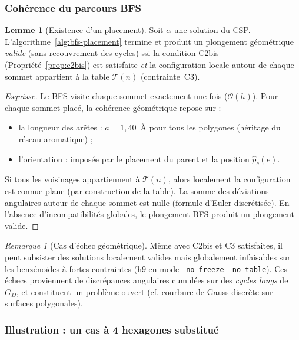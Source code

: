 \documentclass[12pt,a4paper]{article}
\theoremstyle{definition}
\newtheorem{lemme}[definition]{Lemme}
\theoremstyle{remark}
\newtheorem{remarque}[definition]{Remarque}
\newcommand{\GD}{G_{\!D}}
\newcommand{\Tn}{\mathcal{T}(n)}
\newcommand{\posIn}[2]{\hat{p}_{#1}(#2)}
\newcommand{\bigO}{\mathcal{O}}
\begin{document}
\subsubsection{Coh\'erence du parcours BFS}

\begin{lemme}[Existence d'un placement]
\label{lem:bfs-existence}
Soit $\alpha$ une solution du CSP. L'algorithme~\ref{alg:bfs-placement}
termine et produit un plongement g\'eom\'etrique \emph{valide} (sans
recouvrement des cycles) ssi la condition C2bis
(Propri\'et\'e~\ref{prop:c2bis}) est satisfaite \emph{et} la configuration
locale autour de chaque sommet appartient \`a la table $\Tn$
(contrainte~C3).
\end{lemme}

\begin{proof}[Esquisse]
Le BFS visite chaque sommet exactement une fois ($\bigO(h)$). Pour chaque
sommet plac\'e, la coh\'erence g\'eom\'etrique repose sur :
\begin{itemize}
  \item la longueur des ar\^etes : $a = 1{,}40$~\AA{} pour tous les
        polygones (h\'eritage du r\'eseau aromatique) ;
  \item l'orientation : impos\'ee par le placement du parent et la
        position $\posIn{c}{e}$.
\end{itemize}
Si tous les voisinages appartiennent \`a $\Tn$, alors localement la
configuration est connue plane (par construction de la table). La somme
des d\'eviations angulaires autour de chaque sommet est nulle (formule
d'Euler discr\'etis\'ee). En l'absence d'incompatibilit\'es globales, le
plongement BFS produit un plongement valide.
\end{proof}

\begin{remarque}[Cas d'\'echec g\'eom\'etrique]
M\^eme avec C2bis et C3 satisfaites, il peut subsister des solutions
\og localement valides mais globalement infaisables \fg{} sur les
benz\'eno\"ides \`a fortes contraintes (h9 en mode
\texttt{--no-freeze --no-table}). Ces \'echecs proviennent de
discr\'epances angulaires cumul\'ees sur des \emph{cycles longs} de
$\GD$, et constituent un probl\`eme ouvert (cf. courbure de Gauss
discr\`ete sur surfaces polygonales).
\end{remarque}

\subsubsection{Illustration : un cas \`a 4 hexagones substitu\'e}
\end{document}
